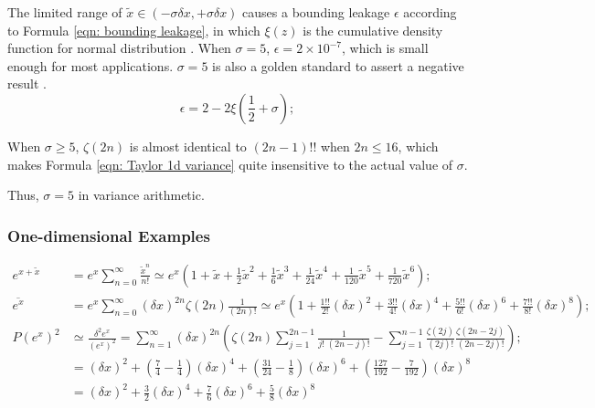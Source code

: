 \documentclass[twoside]{article}
\numberwithin{equation}{section}
\begin{document}
The limited range of $\tilde{x} \in (-\sigma \delta x, +\sigma \delta x)$ causes a bounding leakage $\epsilon$ according to Formula \eqref{eqn: bounding leakage}, in which $\xi(z)$ is the cumulative density function for normal distribution \cite{Probability_Statistics}.
When $\sigma = 5$, $\epsilon = 2 \times 10^{-7}$, which is small enough for most applications.
$\sigma = 5$ is also a golden standard to assert a negative result \cite{Precisions_Physical_Measurements}.
\begin{equation}
\label{eqn: bounding leakage}
\epsilon = 2 - 2 \xi(\frac{1}{2} + \sigma);
\end{equation}

When $\sigma \geq 5$, $\zeta(2n)$ is almost identical to $(2n -1)!!$ when $2n \leq 16$, which makes Formula \eqref{eqn: Taylor 1d variance} quite insensitive to the actual value of $\sigma$.

Thus, $\sigma = 5$ in variance arithmetic.


\subsubsection{One-dimensional Examples}

\iffalse

\begin{align*}
e^{x + \tilde{x}} &= e^x \sum_{n=0}^{\infty} \frac{\tilde{x}^n}{n!}
 \simeq e^x \left(1 + \tilde{x} + \frac{1}{2} \tilde{x}^2 + \frac{1}{6} \tilde{x}^3 + \frac{1}{24} \tilde{x}^4 + \frac{1}{120} \tilde{x}^5 + \frac{1}{720} \tilde{x}^6 \right); \\
\overline{e^x} &= e^x \sum_{n=0}^{\infty} (\delta x)^{2n} \zeta(2n) \frac{1}{(2n)!} 
 \simeq e^x \left(1 + \frac{1!!}{2!} (\delta x)^2 + \frac{3!!}{4!} (\delta x)^4 + \frac{5!!}{6!} (\delta x)^6 + \frac{7!!}{8!} (\delta x)^8 \right); \\
P(e^x)^2 &\simeq \frac{\delta^2 e^x}{(e^x)^2} =  \sum_{n=1}^{\infty} (\delta x)^{2n} \left( \zeta(2n) \sum_{j=1}^{2n-1} \frac{1}{j!\;(2n - j)!} 
   	- \sum_{j=1}^{n-1} \frac{\zeta(2j)}{(2j)!}  \frac{\zeta(2n - 2j)}{(2n - 2j)!} \right); \\
 &= (\delta x)^2 + (\frac{7}{4} - \frac{1}{4}) (\delta x)^4 + (\frac{31}{24} - \frac{1}{8}) (\delta x)^6
  + (\frac{127}{192} - \frac{7}{192}) (\delta x)^8 \\
 &= (\delta x)^2 + \frac{3}{2} (\delta x)^4 + \frac{7}{6} (\delta x)^6 + \frac{5}{8} (\delta x)^8
\end{align*}
\end{document}
